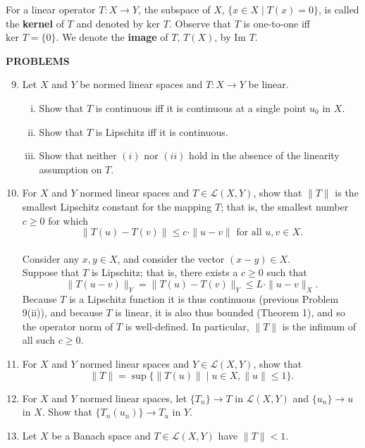 For a linear operator $T:X\to Y$, the subspace of $X$, $\{x\in X\mid T(x)=0\}$, is called the \textbf{kernel} of $T$ and denoted by $\text{ker }T$.
Observe that $T$ is one-to-one iff $\text{ker }T=\{0\}$.
We denote the \textbf{image} of $T$, $T(X)$, by $\text{Im }T$.

\begin{center}
	\textbf{PROBLEMS}
\end{center}
\begin{enumerate}
	\setcounter{enumi}{8}
    \item Let $X$ and $Y$ be normed linear spaces and $T:X\to Y$ be linear.
    \begin{enumerate}[(i)]
        \item Show that $T$ is continuous iff it is continuous at a single point $u_0$ in $X$.
        \item Show that $T$ is Lipschitz iff it is continuous.
        \item Show that neither $(i)$ nor $(ii)$ hold in the absence of the linearity assumption on $T$. 
    \end{enumerate}
    \item For $X$ and $Y$ normed linear spaces and $T\in\mathcal{L}(X,Y)$, show that $\|T\|$ is the smallest Lipschitz constant for the mapping $T$; that is, the smallest number $c\ge0$ for which
    \[
        \|T(u)-T(v)\|\le c\cdot\|u-v\|\text{ for all }u,v\in X.
    \]
    \\Consider any $x,y\in X$, and consider the vector $(x-y)\in X$.
    \\Suppose that $T$ is Lipschitz; that is, there exists a $c\ge0$ such that 
    \[
        \|T(u-v)\|_Y=\|T(u)-T(v)\|_Y\le L\cdot\|u-v\|_X.
    \]
    Because $T$ is a Lipschitz function it is thus continuous (previous Problem 9(ii)), and because $T$ is linear, it is also thus bounded (Theorem 1), and so the operator norm of $T$ is well-defined.
    In particular, $\|T\|$ is the infimum of all such $c\ge0$.
    \item For $X$ and $Y$ normed linear spaces and $Y\in\mathcal{L}(X,Y)$, show that 
    \[
        \|T\|=\sup\{\|T(u)\|\mid u\in X, \|u\|\le1\}.
    \]
    \item For $X$ and $Y$ normed linear spaces, let $\{T_n\}\to T$ in $\mathcal{L}(X,Y)$ and $\{u_n\}\to u$ in $X$.
    Show that $\{T_n(u_n)\}\to T_u$ in $Y$.
    \item Let $X$ be a Banach space and $T\in\mathcal{L}(X,Y)$ have $\|T\|<1$.
    \begin{enumerate}[(i)]

\end{enumerate}
\end{enumerate}
